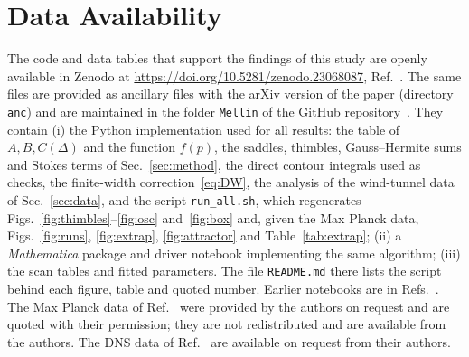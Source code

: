 \documentclass[aip,pof,preprint,floatfix,nofootinbib,amsmath,amssymb]{revtex4-2}
\def\Mathematica{\textit{Mathematica}}
\begin{document}
\section*{Data Availability}
The code and data tables that support the findings of this study are openly available in Zenodo at
\url{https://doi.org/10.5281/zenodo.23068087}, Ref.~. The same files are provided as ancillary files
with the arXiv version of the paper (directory \texttt{anc}) and are maintained in the folder \texttt{Mellin} of the GitHub
repository~\cite{LoopEquationsRepo}. They contain
(i) the Python implementation used for all results: the table of $A,B,C(\Delta)$ and the function $f(p)$, the saddles,
thimbles, Gauss--Hermite sums and Stokes terms of Sec.~\ref{sec:method}, the direct contour integrals used as checks, the
finite-width correction~\eqref{eq:DW}, the analysis of the wind-tunnel data of Sec.~\ref{sec:data}, and the script
\texttt{run\_all.sh}, which regenerates Figs.~\ref{fig:thimbles}--\ref{fig:osc} and~\ref{fig:box} and, given the
Max Planck data, Figs.~\ref{fig:runs}, \ref{fig:extrap}, \ref{fig:attractor} and Table~\ref{tab:extrap};
(ii) a \Mathematica{} package and driver notebook implementing the same algorithm;
(iii) the scan tables and fitted parameters.
The file \texttt{README.md} there lists the script behind each figure, table and quoted number. Earlier notebooks are
in Refs.~. The Max Planck data of Ref.~ were provided by the authors on
request and are quoted with their permission; they are not redistributed and are available from the authors. The DNS data
of Ref.~ are available on request from their authors.



\end{document}
